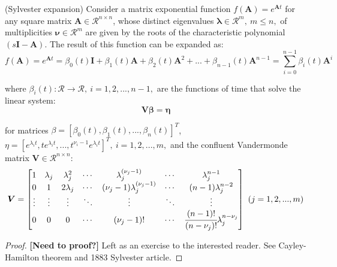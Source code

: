 \documentclass[a4paper,11pt]{book}
\numberwithin{figure}{chapter}
\numberwithin{equation}{chapter}
\numberwithin{table}{chapter}
\newtheorem{theorem}{Theorem}[chapter]
\theoremstyle{definition}
\newcounter{boxed-theorem}
\newenvironment{boxed-theorem}[1]
{\begin{shaded} \begin{theorem}{#1}}
{\end{theorem} \end{shaded}}
\begin{document}
\begin{boxed-theorem}{(Sylvester expansion)} \label{th:sylvester01}
    Consider a matrix exponential function $f(\bm{A}) = e^{\bm{A} t}$ for any square matrix $\bm{A} \in \mathcal{R}^{n \times n}$, whose distinct eigenvalues $\bm{\lambda} \in \mathcal{R}^{m},\ m \leq n,$ of multiplicities $\bm{\nu} \in \mathcal{R}^m$ are given by the roots of the characteristic polynomial $(s\bm{I} - \bm{A})$. The result of this function can be expanded as:
    \begin{equation} 
        f(\bm{A}) = e^{\bm{A} t} = \beta_0(t) \bm{I} + \beta_1(t) \bm{A} + \beta_2(t) \bm{A}^2 + ... + \beta_{n-1}(t) \bm{A}^{n-1} = \sum_{i=0}^{n-1} \beta_i(t) \bm{A}^i
    \end{equation} 
    
    \noindent where $\beta_i(t) : \mathcal{R} \rightarrow \mathcal{R},\ i = 1,2,...,n-1,$ are the functions of time that solve the linear system:
    \begin{equation} 
        \bm{V} \bm{\beta} = \bm{\eta}
    \end{equation} 
    
    \noindent for matrices $\mathcal{\beta} = [\beta_0(t), \beta_1(t), ..., \beta_n(t)]^T$, $\mathcal{\eta} = [e^{\lambda_i t}, te^{\lambda_i t}, ..., t^{\nu_i-1}e^{\lambda_i t}]^T,\ i=1,2,...,m,$ and the confluent Vandermonde matrix $\bm{V} \in \mathcal{R}^{n \times n}$:
    \begin{equation} 
        \bm{V} = \begin{bmatrix}
            1 & \lambda_j & \lambda_j^2 & \cdots & \lambda_j^{(\nu_j - 1)} & \cdots & \lambda_j^{n-1} \\
            0 & 1 & 2\lambda_j & \cdots & (\nu_j - 1) \lambda_j^{(\nu_j - 1)} & \cdots & (n-1)\lambda_j^{n-2} \\
            \vdots & \vdots & \vdots & \ddots & \vdots & \ddots & \vdots \\
            0 & 0 & 0 & \cdots & (\nu_j - 1)! & \cdots & \cfrac{(n - 1)!}{(n - \nu_j)!}\lambda_j^{n-\nu_j} \\
        \end{bmatrix}\ (j = 1,2,...,m)
    \end{equation} 
\end{boxed-theorem}

\begin{proof}
    \textbf{[Need to proof?]} Left as an exercise to the interested reader. See Cayley-Hamilton theorem and 1883 Sylvester article. 
\end{proof}
\end{document}
